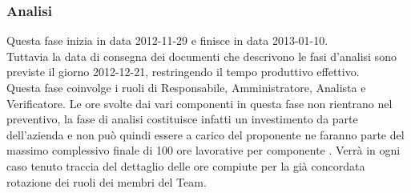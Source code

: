 \subsubsection{Analisi}
Questa fase inizia in data 2012-11-29 e finisce in data 2013-01-10.\\
Tuttavia la data di consegna dei documenti che descrivono le fasi d'analisi sono previste il giorno 2012-12-21, restringendo il tempo produttivo effettivo.\\
Questa fase coinvolge i ruoli di Responsabile, Amministratore, Analista e Verificatore.
Le ore svolte dai vari componenti in questa fase non rientrano nel preventivo, la fase di analisi costituisce infatti un investimento da parte dell’azienda e non può quindi essere a carico del proponente ne faranno parte del massimo complessivo finale di 100 ore lavorative per componente .
Verrà in ogni caso tenuto traccia del dettaglio delle ore compiute per la già concordata rotazione dei ruoli dei membri del Team.

